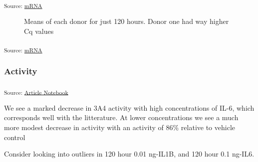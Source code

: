 \documentclass[
  letterpaper,
  DIV=11,
  numbers=noendperiod,
  oneside]{scrartcl}
\begin{document}
\textsubscript{Source:
\href{https://andreasludvig.github.io/manuscript_one/notebooks/qPCR/mRNA-preview.html\#cell-fig-mrna-3a4-il6}{mRNA}}

\begin{figure}[H]


\caption{\label{fig-mrna-120hours}Means of each donor for just 120
hours. Donor one had way higher Cq values}

\end{figure}%

\textsubscript{Source:
\href{https://andreasludvig.github.io/manuscript_one/notebooks/qPCR/mRNA-preview.html\#cell-fig-mrna-120hours}{mRNA}}

\subsubsection{Activity}\label{activity-1}

\textsubscript{Source:
\href{https://andreasludvig.github.io/manuscript_one/index-preview.html}{Article
Notebook}}

We see a marked decrease in 3A4 activity with high concentrations of
IL-6, which corresponds well with the litterature. At lower
concentrations we see a much more modest decrease in activity with an
activity of 86\% relative to vehicle control

Consider looking into outliers in 120 hour 0.01 ng-IL1B, and 120 hour
0.1 ng-IL6.
\end{document}
